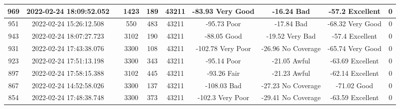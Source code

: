 \begin{longtable*}{|c|c|c|c|c|c|c|c|c|c|}
969&2022-02-24 18:09:52.052&&1423&189&43211& -83.93    Very Good   & -16.24    Bad         & -57.2     Excellent   & 0\\\hline
{}951&2022-02-24 15:26:12.508&&550&483&43211& -95.73    Poor        & -17.84    Bad         & -68.32    Very Good   & 0\\\hline
{}943&2022-02-24 18:07:27.723&&3102&190&43211& -88.05    Good        & -19.52    Very Bad    & -57.4     Excellent   & 0\\\hline
{}931&2022-02-24 17:43:38.076&&3300&108&43211& -102.78   Very Poor   & -26.96    No Coverage & -65.74    Very Good   & 0\\\hline
{}923&2022-02-24 17:51:13.198&&3300&343&43211& -95.14    Poor        & -21.05    Awful       & -63.69    Excellent   & 0\\\hline
{}897&2022-02-24 17:58:15.388&&3102&445&43211& -93.26    Fair        & -21.23    Awful       & -62.14    Excellent   & 0\\\hline
{}867&2022-02-24 14:52:58.026&&3300&137&43211& -108.03   Bad         & -27.23    No Coverage & -71.02    Good        & 0\\\hline
{}854&2022-02-24 17:48:38.748&&3300&373&43211& -102.3    Very Poor   & -29.41    No Coverage & -63.59    Excellent   & 0\\\hline

\end{longtable*}
